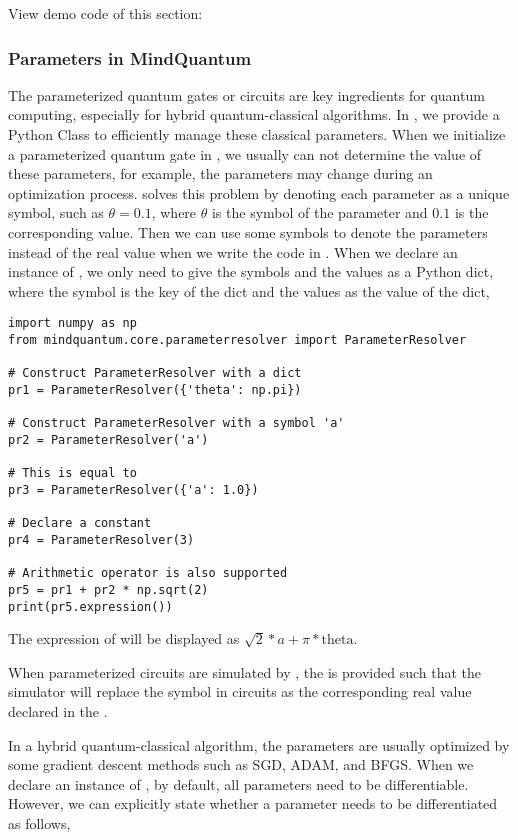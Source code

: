 View demo code of this section: 

\subsubsection{Parameters in MindQuantum}
The parameterized quantum gates or circuits are key ingredients for quantum computing, especially for hybrid quantum-classical algorithms.
In \MindQuantum, we provide a Python Class  to efficiently manage these classical parameters.
When we initialize a parameterized quantum gate in \MindQuantum, we usually can not determine the value of these parameters, for example, the parameters may change during an optimization process.
\ParameterResolver solves this problem by
denoting each parameter as a unique symbol, such as $\theta=0.1$, where $\theta$ is the symbol of the parameter and $0.1$ is the corresponding value.
Then we can use some symbols to denote the parameters instead of the real value when we write the code in \MindQuantum.
When we declare an instance of \ParameterResolver, we only need to give the symbols and the values as a Python dict, where the symbol is the key of the dict and the values as the value of the dict,

\begin{lstlisting}
import numpy as np
from mindquantum.core.parameterresolver import ParameterResolver

# Construct ParameterResolver with a dict
pr1 = ParameterResolver({'theta': np.pi})

# Construct ParameterResolver with a symbol 'a'
pr2 = ParameterResolver('a')

# This is equal to
pr3 = ParameterResolver({'a': 1.0})

# Declare a constant
pr4 = ParameterResolver(3)

# Arithmetic operator is also supported
pr5 = pr1 + pr2 * np.sqrt(2)
print(pr5.expression())
\end{lstlisting}

The expression of  will be displayed as $\sqrt{2}*a + \pi*\text{theta}$.

When parameterized circuits are simulated by \MindQuantum, the \ParameterResolver is provided such that the simulator will replace the symbol in circuits as the corresponding real value declared in the \ParameterResolver.

In a hybrid quantum-classical algorithm, the parameters are usually optimized by some gradient descent methods such as SGD, ADAM, and BFGS. When we declare an instance of \ParameterResolver, by default, all parameters need to be differentiable.
However, we can explicitly state whether a parameter needs to be differentiated as follows,

